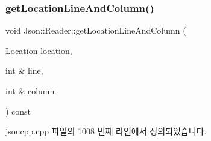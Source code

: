 \subsubsection{\texorpdfstring{get\+Location\+Line\+And\+Column()}{getLocationLineAndColumn()}\hspace{0.1cm}{\footnotesize\ttfamily [1/2]}}
{\footnotesize\ttfamily void Json\+::\+Reader\+::get\+Location\+Line\+And\+Column (\begin{DoxyParamCaption}\item[{\hyperlink{class_json_1_1_reader_a46795b5b272bf79a7730e406cb96375a}{Location}}]{location,  }\item[{int \&}]{line,  }\item[{int \&}]{column }\end{DoxyParamCaption}) const\hspace{0.3cm}{\ttfamily [private]}}



jsoncpp.\+cpp 파일의 1008 번째 라인에서 정의되었습니다.


